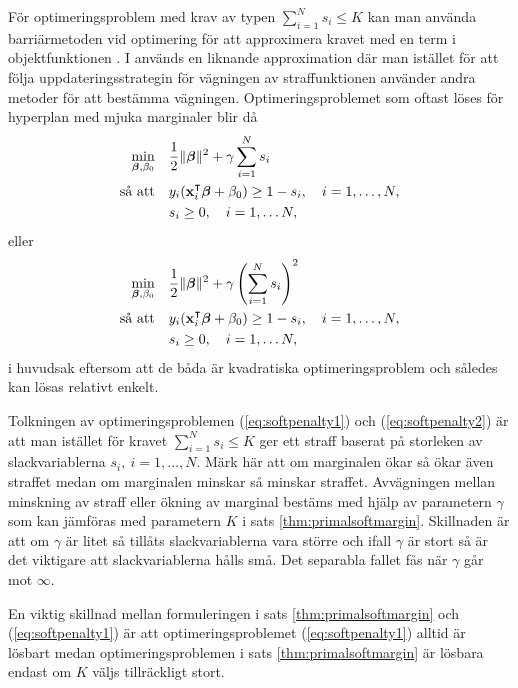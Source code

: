 \documentclass[a4paper, 12pt]{report}
\theoremstyle{definition}
\theoremstyle{remark}
\newcommand{\bfbeta}{{\boldsymbol{\beta}}}
\begin{document}
För optimeringsproblem med krav av typen $\sum_{i=1}^{N}s_i\leq K$ kan man använda barriärmetoden vid optimering för att approximera kravet med en term i objektfunktionen \cite{Boyd}. I \cite{CortesVapnik} används en liknande approximation där man istället för att följa uppdateringsstrategin för vägningen av straffunktionen använder andra metoder för att bestämma vägningen. Optimeringsproblemet som oftast löses för hyperplan med mjuka marginaler blir då
\begin{equation}\label{eq:softpenalty1}
\begin{aligned}
	\operatornamewithlimits{min}_{\bfbeta,\beta_0} & & &\frac{1}{2}\|\bfbeta\|^2 + \gamma\sum_{i=1}^{N} s_i\\
	\text{så att} & & &y_i(\mathbf{x}_i^\intercal\bfbeta+\beta_0)\geq 1 - s_i,\quad i=1,\dots,N,\\
	& & &s_i\geq0,\quad i=1,\dots N,
\end{aligned}
\end{equation}
eller
\begin{equation}\label{eq:softpenalty2}
\begin{aligned}
\operatornamewithlimits{min}_{\bfbeta,\beta_0} & & &\frac{1}{2}\|\bfbeta\|^2 + \gamma\left(\sum_{i=1}^{N} s_i\right)^2\\
\text{så att} & & &y_i(\mathbf{x}_i^\intercal\bfbeta+\beta_0)\geq 1 - s_i,\quad i=1,\dots,N,\\
& & &s_i\geq0,\quad i=1,\dots N,
\end{aligned}
\end{equation}
i huvudsak eftersom att de båda är kvadratiska optimeringsproblem och således kan lösas relativt enkelt.

Tolkningen av optimeringsproblemen (\ref{eq:softpenalty1}) och (\ref{eq:softpenalty2}) är att man istället för kravet $\sum_{i=1}^{N}s_i\leq K$ ger ett straff baserat på storleken av slackvariablerna $s_i,~i=1,\dots,N$. Märk här att om marginalen ökar så ökar även straffet medan om marginalen minskar så minskar straffet. Avvägningen mellan minskning av straff eller ökning av marginal bestäms med hjälp av parametern $\gamma$ som kan jämföras med parametern $K$ i sats \ref{thm:primalsoftmargin}. Skillnaden är att om $\gamma$ är litet så tillåts slackvariablerna vara större och ifall $\gamma$ är stort så är det viktigare att slackvariablerna hålls små. Det separabla fallet fås när $\gamma$ går mot $\infty$.

En viktig skillnad mellan formuleringen i sats \ref{thm:primalsoftmargin} och (\ref{eq:softpenalty1}) är att optimeringsproblemet (\ref{eq:softpenalty1}) alltid är lösbart medan optimeringsproblemen i sats \ref{thm:primalsoftmargin} är lösbara endast om $K$ väljs tillräckligt stort.
\end{document}
